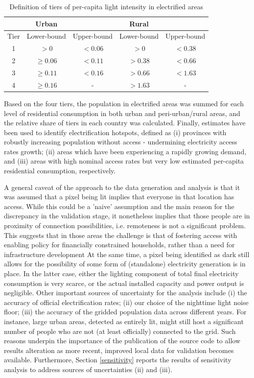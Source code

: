 \documentclass[preprint,12pt]{elsarticle}
\begin{document}
\begin{table}[H]
\centering
\caption{Definition of tiers of per-capita light intensity in electrified areas}
\small
\label{tiers}
\begin{tabular}{@{}c|cc|cc@{}}
\hline  \hline
\multirow{1}{*}{\bfseries} & 
\multirow{1}{*}{\bfseries Urban} & 
\multirow{1}{*}{\bfseries} & 
\multirow{1}{*}{\bfseries Rural}\\ \hline
Tier & Lower-bound & Upper-bound & Lower-bound  & Upper-bound \\ \hline
1  & $>0$ & $<0.06$ & $>0$ & $<0.38$  \\
2  & $\geq0.06$ & $<0.11$ &$ >0.38$ & $<0.66$\\
3  & $\geq0.11$ & $<0.16$  &$>0.66$ & $<1.63$\\
4  & $\geq0.16$ & - & $>1.63$ & - \\ 
\hline
\end{tabular}
\end{table}

Based on the four tiers, the population in electrified areas was summed for each level of residential consumption in both urban and peri-urban/rural areas, and the relative share of tiers in each country was calculated. Finally, estimates have been used to identify electrification hotspots, defined as (i) provinces with robustly increasing population without access - undermining electricity access rates growth; (ii) areas which have been experiencing a rapidly growing demand, and (iii) areas with high nominal access rates but very low estimated per-capita residential consumption, respectively. 

A general caveat of the approach to the data generation and analysis is that it was assumed that a pixel being lit implies that everyone in that location has access. While this could be a 'naive' assumption and the main reason for the discrepancy in the validation stage, it nonetheless implies that those people are in proximity of connection possibilities, i.e. remoteness is not a significant problem. This suggests that in those areas the challenge is that of fostering access with enabling policy for financially constrained households, rather than a need for infrastructure development  At the same time, a pixel being identified as dark still allows for the possibility of some form of (standalone) electricity generation is in place. In the latter case, either the lighting component of total final electricity consumption is very scarce, or the actual installed capacity and power output is negligible.  Other important sources of uncertainty for the analysis include (i) the accuracy of official electrification rates; (ii) our choice of the nighttime light noise floor; (iii) the accuracy of the gridded population data across different years. For instance, large urban areas, detected as entirely lit, might still host a significant number of people who are not (at least officially) connected to the grid. Such reasons underpin the importance of the publication of the source code to allow results alteration as more recent, improved local data for validation becomes available. Furthermore, Section \ref{sensitivity} reports the results of sensitivity analysis to address sources of uncertainties (ii) and (iii). 
\end{document}
